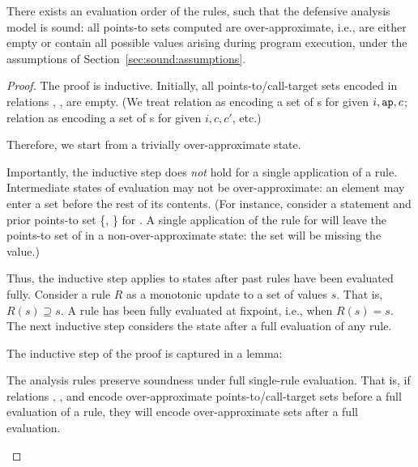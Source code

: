 \begin{theorem}
There exists an evaluation order of the rules, such that the defensive analysis model is sound: all points-to sets computed are over-approximate, i.e., are either empty or contain all possible values arising during program execution, under the assumptions of Section~\ref{sec:sound:assumptions}.

\begin{proof}
The proof is inductive. Initially, all points-to/call-target sets encoded in relations \apin{}{}{}{}, \apout{}{}{}{}, \calls{}{}{}{} are empty. (We treat relation  as encoding a set of s for given $i,\texttt{ap},c$; relation  as encoding a set of s for given $i, c, c'$, etc.)

Therefore, we start from a trivially over-approximate state.

Importantly, the inductive step does \emph{not} hold for a single application of a rule. Intermediate states of evaluation may not be over-approximate: an element may enter a set before the rest of its contents. (For instance, consider a statement  and prior points-to set \{, \} for . A single application of the  rule for  will leave the points-to set of  in a non-over-approximate state: the set will be missing the  value.)

Thus, the inductive step applies to states after past rules have been evaluated fully. Consider a rule $R$ as a monotonic update to a set of values $s$. That is, $R(s) \supseteq s$. A rule has been fully evaluated at fixpoint, i.e., when $R(s) = s$. The next inductive step considers the state after a full evaluation of any rule.

The inductive step of the proof is captured in a lemma:

\begin{lemma}
The analysis rules preserve soundness under full single-rule evaluation. That is, if relations \apin{}{}{}{}, \apout{}{}{}{}, and \calls{}{}{}{} encode over-approximate points-to/call-target sets before a full evaluation of a rule, they will encode over-approximate sets after a full evaluation.
\label{lemma:sound:rule}
\end{lemma}


\end{proof}
\end{theorem}
